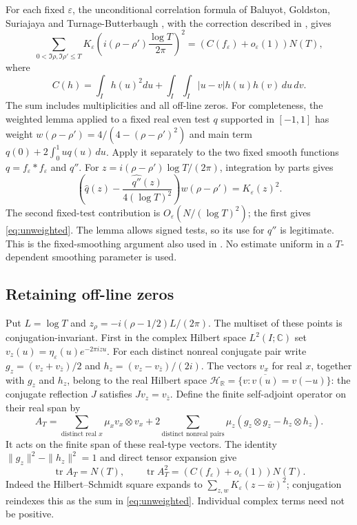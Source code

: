 \documentclass[11pt,a4paper]{article}
\theoremstyle{remark}
\DeclareMathOperator{\tr}{tr}
\newcommand{\R}{\mathbb R}
\begin{document}
For each fixed $\varepsilon$, the unconditional correlation formula
of Baluyot, Goldston, Suriajaya and Turnage-Butterbaugh
\cite[Lemma~5]{BGST}, with the correction described in
\cite[Section~3]{BGSTcorr}, gives
\begin{equation}\label{eq:unweighted}
 \sum_{0<\Im\rho,\Im\rho'\le T}
 K_\varepsilon\left(i(\rho-\rho')\frac{\log T}{2\pi}\right)^2
 =(C(f_\varepsilon)+o_\varepsilon(1))N(T),
\end{equation}
where
\begin{equation}\label{eq:energy}
 C(h)=\int_Ih(u)^2du+
           \int_I\int_I|u-v|h(u)h(v)\,du\,dv.
\end{equation}
The sum includes multiplicities and all off-line zeros.
For completeness, the weighted lemma applied to a fixed real even
test $q$ supported in $[-1,1]$ has weight
$w(\rho-\rho')=4/(4-(\rho-\rho')^2)$ and main term
$q(0)+2\int_0^1u q(u)\,du$.
Apply it separately to the two fixed smooth functions
$q=f_\varepsilon*f_\varepsilon$ and $q''$.
For $z=i(\rho-\rho')\log T/(2\pi)$, integration by parts gives
\[
 \left(\widehat q(z)-\frac{\widehat{q''}(z)}
                            {4(\log T)^2}\right)w(\rho-\rho')
 =K_\varepsilon(z)^2.
\]
The second fixed-test contribution is $O_\varepsilon(N/(\log T)^2)$;
the first gives \eqref{eq:unweighted}. The lemma allows signed tests,
so its use for $q''$ is legitimate.
This is the fixed-smoothing argument also used in \cite{Lamzouri}.
No estimate uniform in a $T$-dependent smoothing parameter is used.

\subsection{Retaining off-line zeros}

Put $L=\log T$ and $z_\rho=-i(\rho-1/2)L/(2\pi)$.
The multiset of these points is conjugation-invariant.
First in the complex Hilbert space $L^2(I;\mathbb C)$ set
$v_z(u)=\eta_\varepsilon(u)e^{-2\pi izu}$.
For each distinct nonreal conjugate pair write
$g_z=(v_z+v_{\bar z})/2$ and
$h_z=(v_z-v_{\bar z})/(2i)$.
The vectors $v_x$ for real $x$, together with $g_z$ and $h_z$,
belong to the real Hilbert space
$\mathcal H_{\R}=\{v:\overline{v(u)}=v(-u)\}$:
the conjugate reflection $J$ satisfies $Jv_z=v_{\bar z}$.
Define the finite self-adjoint operator on their real span by
\[
 A_T=\sum_{\text{distinct real }x}\mu_xv_x\otimes v_x+
       2\sum_{\text{distinct nonreal pairs}}\mu_z
                  (g_z\otimes g_z-h_z\otimes h_z).
\]
It acts on the finite span of these real-type vectors.
The identity $\|g_z\|^2-\|h_z\|^2=1$ and direct tensor expansion give
\begin{equation}\label{eq:operator}
 \tr A_T=N(T),\qquad
 \tr A_T^2=(C(f_\varepsilon)+o_\varepsilon(1))N(T).
\end{equation}
Indeed the Hilbert--Schmidt square expands to
$\sum_{z,w}K_\varepsilon(z-\bar w)^2$; conjugation reindexes this
as the sum in \eqref{eq:unweighted}. Individual complex terms
need not be positive.
\end{document}
